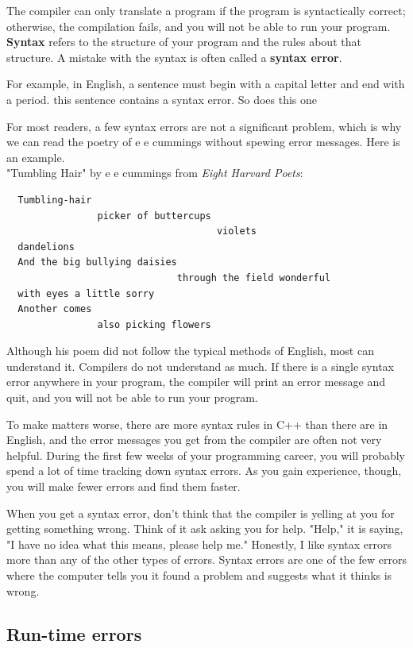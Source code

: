 The compiler can only translate a program if the program is
syntactically correct; otherwise, the compilation fails, and
you will not be able to run your program.  {\bf Syntax}
refers to the structure of your program and the rules about
that structure. A mistake with the syntax is often called a {\bf syntax error}.


For example, in English, a sentence must begin with a capital
letter and end with a period.  this sentence contains a syntax
error.  So does this one

For most readers, a few syntax errors are not a significant problem, which is why we can read the poetry of e e cummings
without spewing error messages. Here is an example.\
\\
"Tumbling Hair" by e e cummings from {\em Eight Harvard Poets}:
\begin{verbatim}
  Tumbling-hair
                picker of buttercups
                                     violets
  dandelions
  And the big bullying daisies
                              through the field wonderful
  with eyes a little sorry
  Another comes
                also picking flowers
\end{verbatim}

Although his poem did not follow the typical
methods of English, most can understand it.
Compilers do not understand as much.  If there is a single syntax
error anywhere in your program, the compiler will print an
error message and quit, and you will not be able to run
your program.

To make matters worse, there are more syntax rules in C++
than there are in English, and the error messages you get from
the compiler are often not very helpful.  During the first
few weeks of your programming career, you will probably
spend a lot of time tracking down syntax errors.  As you
gain experience, though, you will make fewer errors and find
them faster.

When you get a syntax error, don't think that the compiler is yelling at you for getting something wrong. Think of it ask asking you for help. "Help," it is saying, "I have no idea what this means, please help me." Honestly, I like syntax errors more than any of the other types of errors. Syntax errors are one of the few errors where the computer tells you it found a problem and suggests what it thinks is wrong. 
\subsection{Run-time errors}
\label{run-time}

